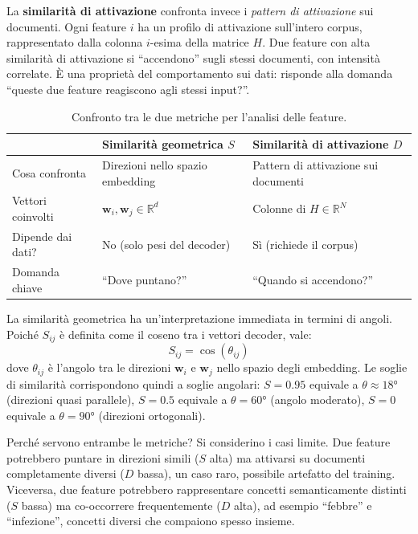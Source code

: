 La \textbf{similarità di attivazione} confronta invece i \textit{pattern di attivazione} sui documenti. Ogni feature $i$ ha un profilo di attivazione sull'intero corpus, rappresentato dalla colonna $i$-esima della matrice $H$. Due feature con alta similarità di attivazione si ``accendono'' sugli stessi documenti, con intensità correlate. È una proprietà del comportamento sui dati: risponde alla domanda ``queste due feature reagiscono agli stessi input?''.

\begin{table}[htbp]
    \centering
    \caption{Confronto tra le due metriche per l'analisi delle feature.}
    \label{tab:similarity_comparison}
    \begin{tabular}{@{}p{2.8cm}p{4.5cm}p{4.5cm}@{}}
        \toprule
        & \textbf{Similarità geometrica} $S$ & \textbf{Similarità di attivazione} $D$ \\
        \midrule
        Cosa confronta & Direzioni nello spazio embedding & Pattern di attivazione sui documenti \\[0.5em]
        Vettori coinvolti & $\mathbf{w}_i, \mathbf{w}_j \in \mathbb{R}^d$ & Colonne di $H \in \mathbb{R}^N$ \\[0.5em]
        Dipende dai dati? & No (solo pesi del decoder) & Sì (richiede il corpus) \\[0.5em]
        Domanda chiave & ``Dove puntano?'' & ``Quando si accendono?'' \\
        \bottomrule
    \end{tabular}
\end{table}

La similarità geometrica ha un'interpretazione immediata in termini di angoli. Poiché $S_{ij}$ è definita come il coseno tra i vettori decoder, vale:
\begin{equation}
    S_{ij} = \cos(\theta_{ij})
    \label{eq:similarity_angle}
\end{equation}
dove $\theta_{ij}$ è l'angolo tra le direzioni $\mathbf{w}_i$ e $\mathbf{w}_j$ nello spazio degli embedding. Le soglie di similarità corrispondono quindi a soglie angolari: $S = 0.95$ equivale a $\theta \approx 18°$ (direzioni quasi parallele), $S = 0.5$ equivale a $\theta = 60°$ (angolo moderato), $S = 0$ equivale a $\theta = 90°$ (direzioni ortogonali).

Perché servono entrambe le metriche? Si considerino i casi limite. Due feature potrebbero puntare in direzioni simili ($S$ alta) ma attivarsi su documenti completamente diversi ($D$ bassa), un caso raro, possibile artefatto del training. Viceversa, due feature potrebbero rappresentare concetti semanticamente distinti ($S$ bassa) ma co-occorrere frequentemente ($D$ alta), ad esempio ``febbre'' e ``infezione'', concetti diversi che compaiono spesso insieme.

